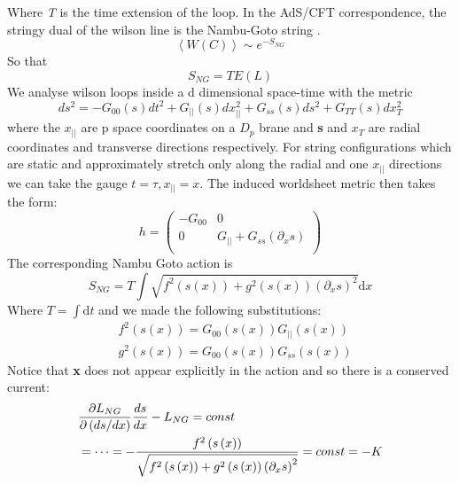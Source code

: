 \documentclass[11pt,a4paper]{article}
\begin{document}
Where \emph{T} is the time extension of the loop. In the AdS/CFT correspondence, the stringy dual of the wilson line is the Nambu-Goto string \cite{Maldacena98}.
\begin{equation}
\left\langle W\left(C\right)\right\rangle\sim e^{-S_{NG}}
\end{equation}
So that
\begin{equation}
S_{NG}=TE\left(L\right)
\end{equation}
We analyse wilson loops inside a d dimensional space-time with the metric \cite{Kinar99}
\begin{equation}
ds^2=-G_{00}\left(s\right)dt^2+G_{||}\left(s\right)dx_{||}^2+G_{ss}\left(s\right)ds^2+G_{TT}\left(s\right)dx_T^2
\end{equation}
where the $x_{||}$ are p space coordinates on a $D_p$ brane and \textbf{s} and $x_T$ are radial coordinates and transverse directions respectively. For string configurations which are static and approximately stretch only along the radial and one $x_{||}$ directions we can take the gauge $t=\tau, x_{||}=x$. The induced worldsheet metric then takes the form:
\begin{equation}
h=
\begin{pmatrix}
-G_{00}	& 0 \\
0		& G_{||}+G_{ss}\left(\partial_{x}s\right) \\ 
\end{pmatrix}
\end{equation} 
The corresponding Nambu Goto action is
\begin{equation}
S_{NG}=T\int\sqrt{f^2\left(s\left(x\right)\right)+g^2\left(s\left(x\right)\right)\left(\partial_xs\right)^2}\mathrm{d}x
\end{equation}
Where $T=\int\mathrm{d}t$ and we made the following substitutions:
\begin{subequations}
\begin{align}
&f^2\left(s\left(x\right)\right)=G_{00}\left(s\left(x\right)\right)G_{||}\left(s\left(x\right)\right)\\
&g^2\left(s\left(x\right)\right)=G_{00}\left(s\left(x\right)\right)G_{ss}\left(s\left(x\right)\right)
\end{align}
\end{subequations}
Notice that \textbf{x} does not appear explicitly in the action and so there is a conserved current:
\begin{align}
&\frac{\partial L_{NG}}{\partial \left(ds/dx\right)}\frac{ds}{dx}-L_{NG}=const \notag \\
&=\cdots=-\frac{f^2\left(s\left(x\right)\right)}{\sqrt{f^2\left(s\left(x\right)\right)+g^2\left(s\left(x\right)\right)\left(\partial_xs\right)^2}}=const=-K
\end{align}
\end{document}

